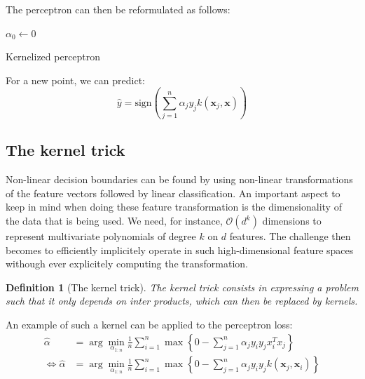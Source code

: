 \documentclass[a4paper,10pt,twoside]{article}
\newtheorem{definition}{Definition}[section]
\begin{document}
The perceptron can then be reformulated as follows:

\begin{algorithm}[H]
    \SetAlgoLined
    $\alpha_0\leftarrow 0$\;
    \caption{Kernelized perceptron}
\end{algorithm}

For a new point, we can predict:
\begin{equation*}
    \hat{y}=\text{sign}(\sum_{j=1}^{n}\alpha_jy_jk(\mathbf{x}_j,\mathbf{x}))
\end{equation*}

\subsection{The kernel trick}

Non-linear decision boundaries can be found by using non-linear transformations of the feature vectors followed by linear classification. An important aspect to keep in mind when doing these feature transformation is the dimensionality of the data that is being used. We need, for instance, $\mathcal{O}(d^k)$ dimensions to represent multivariate polynomials of degree $k$ on $d$ features. The challenge then becomes to efficiently implicitely operate in such high-dimensional feature spaces withough ever explicitely computing the transformation.


\begin{definition}[The kernel trick]
    The kernel trick consists in expressing a problem such that it only depends on inter products, which can then be replaced by kernels.
\end{definition}
An example of such a kernel can be applied to the perceptron loss:
\begin{align*}
    \hat{\alpha} &=\arg\min_{\alpha_{1:n}}\frac{1}{n}\sum_{i=1}^{n}\max\left\{0 -\sum_{j=1}^{n}\alpha_jy_iy_jx_i^Tx_j\right\}\\
    \Leftrightarrow \hat{\alpha} &= \arg\min_{\alpha_{1:n}}\frac{1}{n}\sum_{i=1}^{n}\max\left\{0 -\sum_{j=1}^{n}\alpha_jy_iy_jk(\mathbf{x}_j, \mathbf{x}_i)\right\}
\end{align*}
\end{document}
